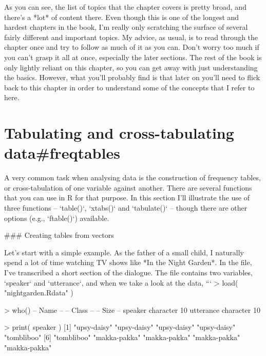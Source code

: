 As you can see, the list of topics that the chapter covers is pretty broad, and there's a *lot* of content there. Even though this is one of the longest and hardest chapters in the book, I'm really only scratching the surface of several fairly different and important topics. My advice, as usual, is to read through the chapter once and try to follow as much of it as you can. Don't worry too much if you can't grasp it all at once, especially the later sections. The rest of the book is only lightly reliant on this chapter, so you can get away with just understanding the basics. However, what you'll probably find is that later on you'll need to flick back to this chapter in order to understand some of the concepts that I refer to here.




\section{Tabulating and cross-tabulating data{#freqtables}}

A very common task when analysing data is the construction of frequency tables, or cross-tabulation of one variable against another. There are several functions that you can use in R for that purpose. In this section I'll illustrate the use of three functions -- `table()`, `xtabs()` and `tabulate()` -- though there are other options (e.g., `ftable()`) available. 

### Creating tables from vectors

Let's start with a simple example. As the father of a small child, I naturally spend a lot of time watching TV shows like *In the Night Garden*. In the  file, I've transcribed a short section of the dialogue. The file contains two variables, `speaker` and `utterance`, and when we take a look at the data,
```
> load( "nightgarden.Rdata" )

> who()
   -- Name --   -- Class --   -- Size --
   speaker      character     10        
   utterance    character     10        

> print( speaker )
 [1] "upsy-daisy"  "upsy-daisy"  "upsy-daisy"  "upsy-daisy"  "tombliboo"  
 [6] "tombliboo"   "makka-pakka" "makka-pakka" "makka-pakka" "makka-pakka"

